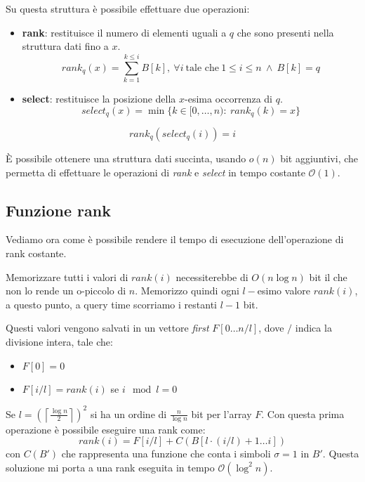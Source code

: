 Su questa struttura è possibile effettuare due operazioni:
\begin{itemize}
    \item \textbf{rank}: restituisce il numero di elementi uguali a $q$ che sono
          presenti nella struttura dati fino a $x$.
          \begin{equation}
              rank_q(x) = \sum_{k = 1}^{k \leq i} B[k], \ \forall i \ \text{tale che} \ 1 \leq i \leq n \ \land \ B[k] = q
          \end{equation}
    \item \textbf{select}: restituisce la posizione della $x$-esima occorrenza di $q$.
          \begin{equation}
              select_q(x) = \min{\{k \in [0, \dots, n): \ rank_q(k) = x\}}
          \end{equation}
\end{itemize}
\begin{nota}
    \begin{equation}
        rank_q(select_q(i)) = i
    \end{equation}
\end{nota}

È possibile ottenere una struttura dati succinta, usando $o(n)$ bit aggiuntivi,
che permetta di effettuare le operazioni di \textit{rank} e \textit{select} in tempo
costante $\mathcal{O}(1)$.
\subsection{Funzione rank}
Vediamo ora come è possibile rendere il tempo di esecuzione dell'operazione di
rank costante.

Memorizzare tutti i valori di $rank(i)$ necessiterebbe di $O(n \log n)$ bit il
che non lo rende un o-piccolo di $n$. Memorizzo quindi ogni $l-$esimo valore $rank(i)$,
a questo punto, a query time scorriamo i restanti $l-1$ bit.

Questi valori vengono salvati in un vettore \textit{first} $F[0 \dots n / l]$,
dove $/$ indica la divisione intera, tale che:
\begin{itemize}
    \item $F[0] = 0$
    \item $F[i / l] = rank(i)$ se $i \mod l = 0$
\end{itemize}

Se $l = \left(\left\lceil \frac{\log n}{2} \right\rceil \right)^2$ si ha un ordine
di $\frac{n}{\log n}$ bit per l'array $F$. Con questa prima operazione è possibile
eseguire una rank come:
\begin{equation}
    rank(i) = F[i/l] + C(B[l \cdot (i / l) + 1 \dots i])
\end{equation}
con $C(B')$ che rappresenta una funzione che conta i simboli $\sigma = 1$ in $B'$.
Questa soluzione mi porta a una rank eseguita in tempo $\mathcal{O}( \log^2 n )$.

